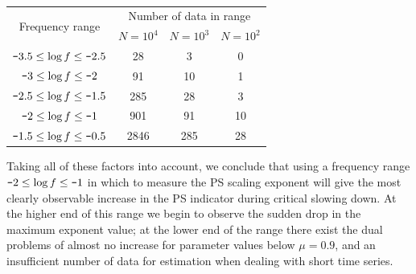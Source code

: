 {{\begin{table}
	\centering
	\begin{tabular}{ c c  c  c }
		\hline
		\multirow{2}{*}{Frequency range} & \multicolumn{3}{c}{Number of data in range}\\
		& $N=10^{4}$ & $N=10^{3}$ & $N=10^{2}$\\
		\hline \hline
		$\textup{\texttt{-}}3.5\leq\log f\leq\textup{\texttt{-}}2.5$ & 28   & 3   & 0\\
		$\textup{\texttt{-}}3\leq\log f\leq\textup{\texttt{-}}2$     & 91   & 10  & 1\\
		$\textup{\texttt{-}}2.5\leq\log f\leq\textup{\texttt{-}}1.5$ & 285  & 28  & 3\\
		$\textup{\texttt{-}}2\leq\log f\leq\textup{\texttt{-}}1$     & 901  & 91  & 10\\
		$\textup{\texttt{-}}1.5\leq\log f\leq\textup{\texttt{-}}0.5$ & 2846 & 285 & 28\\
		\hline
	\end{tabular}
	\caption{}
	\label{tab:1D:AR1_frequencyrange}
\end{table}

Taking all of these factors into account, we conclude that using a frequency range $\textup{\texttt{-}}2\leq\log f\leq\textup{\texttt{-}}1$ in which to measure the PS scaling exponent will give the most clearly observable increase in the PS indicator during critical slowing down. At the higher end of this range we begin to observe the sudden drop in the maximum exponent value; at the lower end of the range there exist the dual problems of almost no increase for parameter values below $\mu=0.9$, and an insufficient number of data for estimation when dealing with short time series.

}


}
